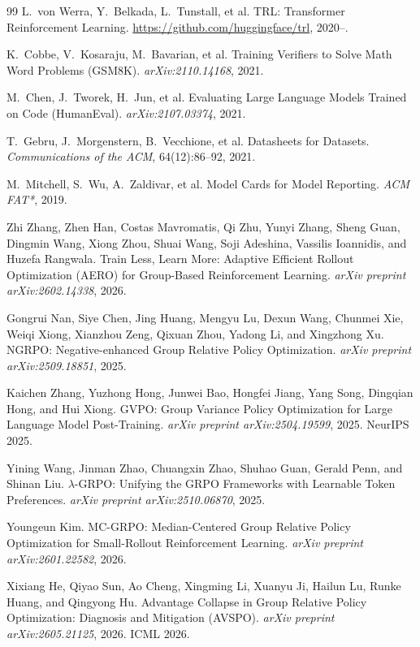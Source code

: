 \documentclass[11pt,a4paper]{article}
\begin{document}
\begin{thebibliography}{99}
L.~von Werra, Y.~Belkada, L.~Tunstall, et al.
\newblock TRL: Transformer Reinforcement Learning.
\newblock \url{https://github.com/huggingface/trl}, 2020--.

K.~Cobbe, V.~Kosaraju, M.~Bavarian, et al.
\newblock Training Verifiers to Solve Math Word Problems (GSM8K).
\newblock \emph{arXiv:2110.14168}, 2021.

M.~Chen, J.~Tworek, H.~Jun, et al.
\newblock Evaluating Large Language Models Trained on Code (HumanEval).
\newblock \emph{arXiv:2107.03374}, 2021.

T.~Gebru, J.~Morgenstern, B.~Vecchione, et al.
\newblock Datasheets for Datasets.
\newblock \emph{Communications of the ACM}, 64(12):86--92, 2021.

M.~Mitchell, S.~Wu, A.~Zaldivar, et al.
\newblock Model Cards for Model Reporting.
\newblock \emph{ACM FAT*}, 2019.


Zhi Zhang, Zhen Han, Costas Mavromatis, Qi Zhu, Yunyi Zhang, Sheng Guan, Dingmin Wang, Xiong Zhou, Shuai Wang, Soji Adeshina, Vassilis Ioannidis, and Huzefa Rangwala.
\newblock Train Less, Learn More: Adaptive Efficient Rollout Optimization (AERO) for Group-Based Reinforcement Learning.
\newblock \emph{arXiv preprint arXiv:2602.14338}, 2026.

Gongrui Nan, Siye Chen, Jing Huang, Mengyu Lu, Dexun Wang, Chunmei Xie, Weiqi Xiong, Xianzhou Zeng, Qixuan Zhou, Yadong Li, and Xingzhong Xu.
\newblock NGRPO: Negative-enhanced Group Relative Policy Optimization.
\newblock \emph{arXiv preprint arXiv:2509.18851}, 2025.

Kaichen Zhang, Yuzhong Hong, Junwei Bao, Hongfei Jiang, Yang Song, Dingqian Hong, and Hui Xiong.
\newblock GVPO: Group Variance Policy Optimization for Large Language Model Post-Training.
\newblock \emph{arXiv preprint arXiv:2504.19599}, 2025. NeurIPS 2025.

Yining Wang, Jinman Zhao, Chuangxin Zhao, Shuhao Guan, Gerald Penn, and Shinan Liu.
\newblock $\lambda$-GRPO: Unifying the GRPO Frameworks with Learnable Token Preferences.
\newblock \emph{arXiv preprint arXiv:2510.06870}, 2025.

Youngeun Kim.
\newblock MC-GRPO: Median-Centered Group Relative Policy Optimization for Small-Rollout Reinforcement Learning.
\newblock \emph{arXiv preprint arXiv:2601.22582}, 2026.

Xixiang He, Qiyao Sun, Ao Cheng, Xingming Li, Xuanyu Ji, Hailun Lu, Runke Huang, and Qingyong Hu.
\newblock Advantage Collapse in Group Relative Policy Optimization: Diagnosis and Mitigation (AVSPO).
\newblock \emph{arXiv preprint arXiv:2605.21125}, 2026. ICML 2026.

\end{thebibliography}
\end{document}
